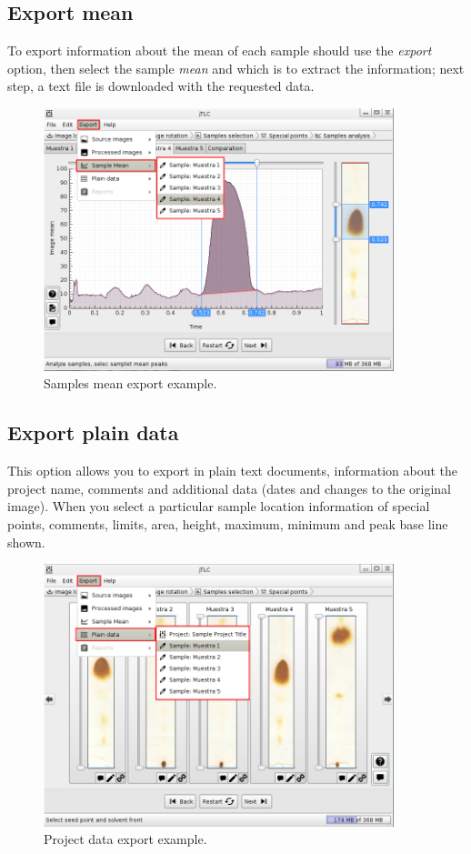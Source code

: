 \subsection{Export mean}
To export information about the mean of each sample should use the \emph{export} option, then select the sample \emph{mean} and which is to extract the information; next step, a text file is downloaded with the requested data.
\begin{figure}[H]
	\vspace{0cm}
	\centering
	\includegraphics[width=385px]{imagenes/export_mean}
	\centering
	\vspace{-0.4cm}
	\caption{Samples mean export example.}
	\label{fig:export_mean}
	\vspace{-0.25cm}
\end{figure}
\newpage

\subsection{Export plain data}
This option allows you to export in plain text documents, information about the project name, comments and additional data (dates and changes to the original image). When you select a particular sample location information of special points, comments, limits, area, height, maximum, minimum and peak base line shown.
\begin{figure}[H]
	\vspace{0cm}
	\centering
	\includegraphics[width=385px]{imagenes/export_data}
	\centering
	\vspace{-0.4cm}
	\caption{Project data export example.}
	\label{fig:export_data}
	\vspace{-0.25cm}
\end{figure}
\newpage